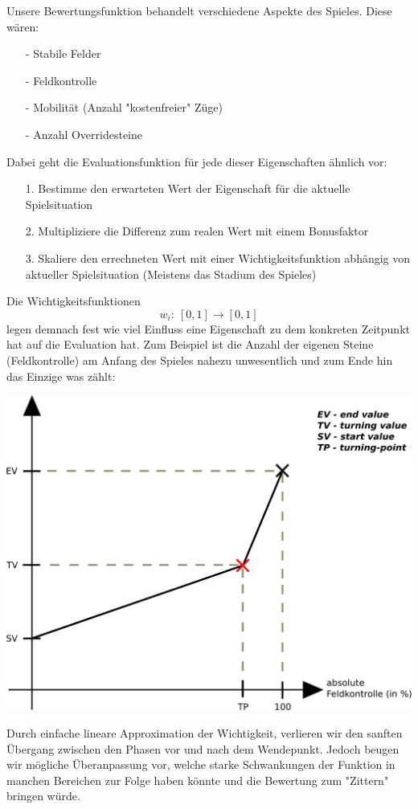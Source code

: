 Unsere Bewertungsfunktion behandelt verschiedene Aspekte des Spieles. Diese wären:
\begin{enumerate}
\item[-] Stabile Felder
\item[-] Feldkontrolle
\item[-] Mobilität (Anzahl "kostenfreier" Züge)
\item[-] Anzahl Overridesteine
\end{enumerate}
Dabei geht die Evaluationsfunktion für jede dieser Eigenschaften ähnlich vor: 
\begin{enumerate}
\item[1.] Bestimme den erwarteten Wert der Eigenschaft für die aktuelle Spielsituation
\item[2.] Multipliziere die Differenz zum realen Wert mit einem Bonusfaktor
\item[3.] Skaliere den errechneten Wert mit einer Wichtigkeitsfunktion abhängig von aktueller Spielsituation (Meistens das Stadium des Spieles)
\end{enumerate}
Die Wichtigkeitsfunktionen $$w_i:\ [0,1] \rightarrow [0,1]$$ legen demnach fest wie viel Einfluss eine Eigenschaft zu dem konkreten Zeitpunkt hat auf die Evaluation hat. Zum Beispiel ist die Anzahl der eigenen Steine (Feldkontrolle) am Anfang des Spieles nahezu unwesentlich und zum Ende hin das Einzige was zählt:
\begin{center}
\includegraphics[scale=0.15]{ImportanceFunctionGraph.pdf}
\end{center}
Durch einfache lineare Approximation der Wichtigkeit, verlieren wir den sanften Übergang zwischen den Phasen vor und nach dem Wendepunkt. Jedoch beugen wir mögliche Überanpassung vor, welche starke Schwankungen der Funktion in manchen Bereichen zur Folge haben könnte und die Bewertung zum "Zittern" bringen würde.\\
